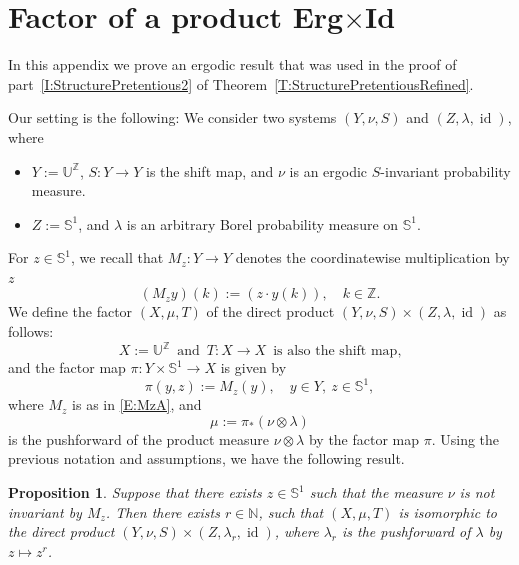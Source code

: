 \documentclass[11pt]{amsart}
\newtheorem{proposition}[lemma]{Proposition}
\theoremstyle{definition}
\newcommand{\N}{{\mathbb N}}
\renewcommand{\S}{\mathbb{S}}
\newcommand{\Z}{{\mathbb Z}}
\newcommand{\U}{{\mathbb U}}
\DeclareMathOperator{\id}{id}
\begin{document}
\section{Factor of a product Erg$\times$Id}
In  this appendix we prove an ergodic result that was used in the proof of part~\eqref{I:StructurePretentious2} of Theorem~\ref{T:StructurePretentiousRefined}.

Our setting is the following:
We consider  two systems $(Y,\nu,S)$ and $(Z,\lambda,\id)$, where
\begin{itemize}
	\item $Y:=\U^\Z$, $S\colon Y\to Y$ is the shift map, and $\nu$ is an ergodic $S$-invariant probability measure.
	
	\smallskip
	
	\item $Z:=\S^1$, and $\lambda$ is an arbitrary Borel probability measure on $\S^1$.
\end{itemize}
For $z\in\S^1$, we recall that $M_z\colon Y\to Y$ denotes the coordinatewise multiplication by $z$
\begin{equation}\label{E:MzA}
	(M_zy)(k):=(z\cdot y(k)), \quad k\in \Z.
\end{equation}
We define the  factor $(X,\mu,T)$ of the direct product $(Y,\nu,S)\times(Z,\lambda,\id)$ as follows:
$$
X:=\U^\Z \, \text{ and } \,  T\colon X\to X \, \text{ is also the shift map,}
$$
and  the factor map
$\pi\colon Y\times \S^1\to X$ is given by
\begin{equation}\label{E:pi}
	\pi(y,z):=M_z(y), \quad y\in Y,\ z\in \S^1,
\end{equation}
where $M_z$ is as in \eqref{E:MzA}, and
\begin{equation}\label{E:mu}
	\mu:=\pi_*(\nu\otimes\lambda)
\end{equation}
is the pushforward of the product measure $\nu\otimes\lambda$ by the factor map $\pi$.
Using the previous notation and assumptions, we have the following result.
\begin{proposition}
	\label{P:product_factor}
	Suppose that there exists $z\in\S^1$ such that the measure  $\nu$ is not invariant by $M_z$. Then there exists $r\in \N$,  such that $(X,\mu,T)$ is isomorphic to the direct product $(Y,\nu,S)\times(Z,\lambda_r,\id)$, where $\lambda_r$ is the pushforward of $\lambda$ by $z\mapsto z^r$.
\end{proposition}
\end{document}
